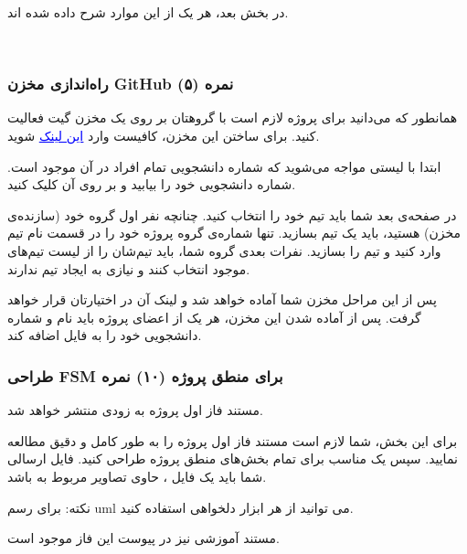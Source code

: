 \documentclass[]{article}
\begin{document}
در بخش بعد، هر یک از این موارد شرح داده شده اند.

\newpage
\Large \textbf{\\
}



\subsubsection*{{\titr راه‌اندازی مخزن GitHub} (۵) نمره}
\label{subsubsec:github}

همانطور که می‌دانید برای پروژه لازم است با گروهتان بر روی یک مخزن  گیت فعالیت کنید. برای ساختن این مخزن، کافیست وارد
\href{https://classroom.github.com/a/rBR982eM}{\textcolor{blue}{\underline{این لینک}}} 
شوید.

ابتدا با لیستی مواجه می‌شوید که شماره دانشجویی تمام افراد در آن موجود است. شماره دانشجویی خود را بیابید و بر روی آن کلیک کنید.

در صفحه‌ی بعد شما باید تیم خود را انتخاب کنید. چنانچه نفر اول گروه خود (سازنده‌ی مخزن) هستید، باید یک تیم بسازید. تنها شماره‌ی گروه پروژه خود را در قسمت نام تیم وارد کنید و تیم را بسازید. نفرات بعدی گروه شما، باید تیم‌شان را از لیست تیم‌های موجود انتخاب کنند و نیازی به ایجاد تیم ندارند.

پس از این مراحل مخزن شما آماده خواهد شد و لینک آن در اختیارتان قرار خواهد گرفت. پس از آماده شدن این مخزن، هر یک از اعضای پروژه باید نام و شماره دانشجویی خود را به فایل  اضافه کند.






\subsubsection*{{\titr طراحی FSM برای منطق پروژه} (۱۰) نمره}
\label{subsubsec:fsm}

مستند فاز اول پروژه به زودی منتشر خواهد شد.

برای این بخش، شما لازم است مستند فاز اول پروژه را به طور کامل و دقیق مطالعه نمایید. سپس یک  مناسب برای تمام بخش‌های منطق پروژه طراحی کنید. فایل ارسالی شما باید یک فایل ، حاوی تصاویر مربوط به  باشد.

نکته: برای رسم uml می توانید از هر ابزار دلخواهی استفاده کنید.

مستند آموزشی  نیز در پیوست این فاز موجود است.
\end{document}
